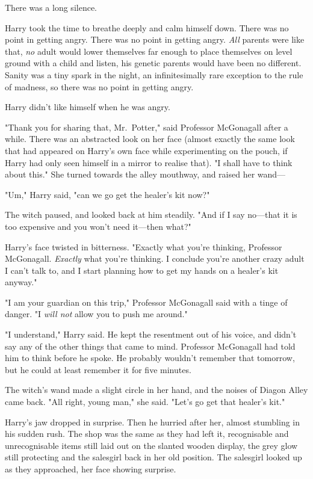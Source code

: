 There was a long silence.

Harry took the time to breathe deeply and calm himself down. There was no point 
in getting angry. There was no point in getting angry. \emph{All} parents were 
like that, \emph{no} adult would lower themselves far enough to place 
themselves on level ground with a child and listen, his genetic parents would 
have been no different. Sanity was a tiny spark in the night, an 
infinitesimally rare exception to the rule of madness, so there was no point in 
getting angry.

Harry didn't like himself when he was angry.

"Thank you for sharing that, Mr.~Potter," said Professor McGonagall after a 
while. There was an abstracted look on her face (almost exactly the same look 
that had appeared on Harry's own face while experimenting on the pouch, if 
Harry had only seen himself in a mirror to realise that). "I shall have to 
think about this." She turned towards the alley mouthway, and raised her wand---

"Um," Harry said, "can we go get the healer's kit now?"

The witch paused, and looked back at him steadily. "And if I say no---that it 
is too expensive and you won't need it---then what?"

Harry's face twisted in bitterness. "Exactly what you're thinking, Professor 
McGonagall. \emph{Exactly} what you're thinking. I conclude you're another 
crazy adult I can't talk to, and I start planning how to get my hands on a 
healer's kit anyway."

"I am your guardian on this trip," Professor McGonagall said with a tinge of 
danger. "I \emph{will not} allow you to push me around."

"I understand," Harry said. He kept the resentment out of his voice, and didn't 
say any of the other things that came to mind. Professor McGonagall had told 
him to think before he spoke. He probably wouldn't remember that tomorrow, but 
he could at least remember it for five minutes.

The witch's wand made a slight circle in her hand, and the noises of Diagon 
Alley came back. "All right, young man," she said. "Let's go get that healer's 
kit."

Harry's jaw dropped in surprise. Then he hurried after her, almost stumbling in 
his sudden rush.
\sbreak
The shop was the same as they had left it, recognisable and unrecognisable 
items still laid out on the slanted wooden display, the grey glow still 
protecting and the salesgirl back in her old position. The salesgirl looked up 
as they approached, her face showing surprise.

